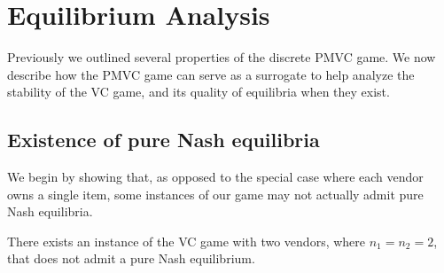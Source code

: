 \section{Equilibrium Analysis}

Previously we outlined
several properties of the discrete PMVC game. We now describe
how the PMVC game can serve as a surrogate to help analyze
the stability of the VC game, and its quality of equilibria when they exist.

\subsection{Existence of pure Nash equilibria}
We begin by showing that, as opposed to the special case where each vendor owns a single item, some instances of our game may not actually admit pure Nash equilibria. 
\begin{proposition}
  \label{prop:no_PNE}
There exists an instance of the VC game with two vendors, where $n_1=n_2=2$, that does not admit a pure Nash equilibrium.
\end{proposition}
